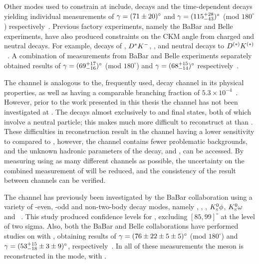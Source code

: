 Other modes used to constrain \Pgamma at \lhcb include, \decay{\Bz}{\D\Kstarz} decays and the time-dependent \decay{\Bs}{\Dspm\Kmp} decays yielding individual measurements of $\gamma = (71 \pm 20)^{\circ}$ and $\gamma = (115^{+28}_{-43})^{\circ}$ (mod $180^{\circ}$) respectively~\cite{LHCb-PAPER-2016-006,LHCb-PAPER-2014-038}. Previous \B factory experiments, namely the BaBar and Belle experiments, have also produced constraints on the CKM angle \Pgamma from charged and neutral \B decays. For example, decays of \decay{\Bm}{\D\Km}, ${D}^*{{K}^-}$, \D\Kstarm, and neutral \B decays to ${D}^{(*)}K^{(*)}$~\cite{BabarGLW_latest,BabarADS_latest,BaBar-Gamma-2013,BaBarGGSZ,BaBar_B0,BelleGLW_latest,BelleADS_latest,BelleGGSZ}. A combination of measurements from BaBar and Belle experiments separately obtained results of $\gamma = (69^{+17}_{-16})^{\circ}$ (mod $180^{\circ}$) and $\gamma = (68^{+15}_{-14})^{\circ}$ respectively~\cite{Babar_gamma,Belle_gamma}.

The \decay{\Bm}{\D\Kstarm} channel is analogous to the, frequently used, \decay{\Bm}{\D\Km} decay channel in its physical properties, as well as having a comparable branching fraction of $5.3 \times 10^{-4}$~\cite{PDG2016}. However, prior to the work presented in this thesis the \decay{\Bm}{\D\Kstarm} channel has not been investigated at \lhcb. The \Kstarm decays almost exclusively to \Kz\pim and \Km\piz final states, both of which involve a neutral particle; this makes \decay{\Bm}{\D\Kstarm} much more difficult to reconstruct at \lhcb than \decay{\Bm}{\D\Km}. These difficulties in reconstruction result in the \decay{\Bm}{\D\Kstarm} channel having a lower sensitivity to \Pgamma compared to \decay{\Bm}{\D\Kstarm}, however, the \decay{\Bm}{\D\Kstarm} channel contains fewer problematic backgrounds, and the unknown hadronic parameters of the \decay{\Bm}{\D\Kstarm} decay, \rb and \deltab, can be accessed. By measuring \Pgamma using as many different channels as possible, the uncertainty on the combined measurement of \Pgamma will be reduced, and the consistency of the result between channels can be verified. 

The \decay{\Bm}{\D\Kstarm} channel has previously been investigated by the BaBar collaboration using a variety of \CP-even, \CP-odd and non-\CP two-body \D decay modes, namely \Km\Kp, \pim\pip, \KS\piz, ${{K}^0_{\mathrm{ \scriptscriptstyle S}}}\phi$, ${{K}^0_{\mathrm{ \scriptscriptstyle S}}}\omega$ and \Km\pip~\cite{BaBarDKstar}. This study produced confidence levels for \Pgamma, excluding $[85,99]^{\circ}$ at the level of two sigma. Also, both the BaBar and Belle collaborations have performed studies on \decay{\Bm}{\D\Kstarm} with \decay{\D}{\KS\pip\pim}, obtaining results of $\gamma = (76 \pm 22 \pm 5 \pm 5)^{\circ}$ (mod $180^{\circ}$) and $\gamma = (53^{+15}_{-18} \pm 3 \pm 9)^{\circ}$, respectively~\cite{BaBarGGSZ,BelleGGSZ}. In all of these measurements the \Kstarm meson is reconstructed in the \KS\pim mode, with \decay{\KS}{\pip\pim}.

